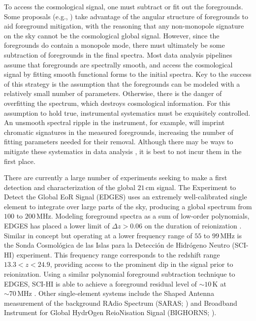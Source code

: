 \documentclass[twocolumn,apj,numberedappendix]{emulateapj}
\begin{document}
To access the cosmological signal, one must subtract or fit out the foregrounds. Some proposals (e.g., \citealt{L13}) take advantage of the angular structure of foregrounds to aid foreground mitigation, with the reasoning that any non-monopole signature on the sky cannot be the cosmological global signal. However, since the foregrounds do contain a monopole mode, there must ultimately be some subtraction of foregrounds in the final spectra. Most data analysis pipelines assume that foregrounds are spectrally smooth, and access the cosmological signal by fitting smooth functional forms to the initial spectra. Key to the success of this strategy is the assumption that the foregrounds can be modeled with a relatively small number of parameters. Otherwise, there is the danger of overfitting the spectrum, which destroys cosmological information. For this assumption to hold true, instrumental systematics must be exquisitely controlled. An unsmooth spectral ripple in the instrument, for example, will imprint chromatic signatures in the measured foregrounds, increasing the number of fitting parameters needed for their removal. Although there may be ways to mitigate these systematics in data analysis \citep{Liu_Switzer_2014}, it is best to not incur them in the first place.

There are currently a large number of experiments seeking to make a first detection and characterization of the global $21\,\textrm{cm}$ signal.  The Experiment to Detect the Global EoR Signal (EDGES) uses an extremely well-calibrated single element \citep{rogersCalib} to integrate over large parts of the sky, producing a global spectrum from $100$ to $200\,\textrm{MHz}$.  Modeling foreground spectra as a sum of low-order polynomials, EDGES has placed a lower limit of $\Delta z > 0.06$ on the duration of reionization \citep{bowmanRogersMeasurement}.  Similar in concept but operating at a lower frequency range of $55$ to $99\,\textrm{MHz}$ is the Sonda Cosmol\'{o}gica de las Islas para la Detecci\'{o}n de Hidr\'{o}geno Neutro (SCI-HI) experiment.  This frequency range corresponds to the redshift range $13.3 < z < 24.9$, providing access to the prominent dip in the signal prior to reionization.  Using a similar polynomial foreground subtraction technique to EDGES, SCI-HI is able to achieve a foreground residual level of $\sim 10\,\textrm{K}$ at $\sim 70 \,\textrm{MHz}$ \citep{voytekSCIHI}. Other single-element systems include the Shaped Antenna measurement of the background RAdio Spectrum (SARAS; \citealt{PatraSARAS}) and Broadband Instrument for Global HydrOgen ReioNisation Signal (BIGHORNS; \citealt{BIGHORNS}).
\end{document}
